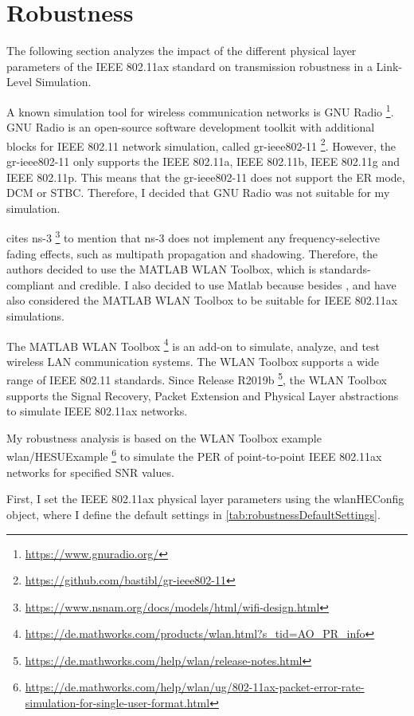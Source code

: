 \section{Robustness}
\label{sec:Robustness}
The following section analyzes the impact of the different physical layer parameters of the IEEE 802.11ax standard on transmission robustness in a
Link-Level Simulation.

A known simulation tool for wireless communication networks is GNU Radio \footnote{\url{https://www.gnuradio.org/}}.
GNU Radio is an open-source software development toolkit with additional blocks for IEEE 802.11 network simulation,
called gr-ieee802-11 \footnote{\url{https://github.com/bastibl/gr-ieee802-11}}.
However, the gr-ieee802-11 only supports the IEEE 802.11a, IEEE 802.11b, IEEE 802.11g and IEEE 802.11p.
This means that the gr-ieee802-11 does not support the \ac{ER} mode, \ac{DCM} or \ac{STBC}.
Therefore, I decided that GNU Radio was not suitable for my simulation.

\textcite{sheela_performance_2022} cites ns-3 \footnote{\url{https://www.nsnam.org/docs/models/html/wifi-design.html}} to mention
that ns-3 does not implement
any frequency-selective fading effects, such as multipath propagation and shadowing.
Therefore, the authors decided to use the MATLAB WLAN Toolbox, which is standards-compliant and credible.
I also decided to use Matlab because besides \cite{sheela_performance_2022}, \cite{cao_efficient_2022} and
\cite{jin_efficient_2021} have also considered
the MATLAB WLAN Toolbox to be suitable for IEEE 802.11ax simulations.

The MATLAB WLAN Toolbox \footnote{\url{https://de.mathworks.com/products/wlan.html?s_tid=AO_PR_info}} is an add-on to simulate, analyze, and test wireless LAN communication systems.
The WLAN Toolbox supports a wide range of IEEE 802.11 standards.
Since Release R2019b \footnote{\url{https://de.mathworks.com/help/wlan/release-notes.html}}, the WLAN Toolbox supports the Signal Recovery, Packet Extension and Physical Layer abstractions to simulate IEEE 802.11ax networks.

My robustness analysis is based on the WLAN Toolbox example wlan/HESUExample \footnote{\url{https://de.mathworks.com/help/wlan/ug/802-11ax-packet-error-rate-simulation-for-single-user-format.html}} to simulate the \ac{PER} of point-to-point IEEE 802.11ax networks for
 specified \ac{SNR} values.

First, I set the IEEE 802.11ax physical layer parameters using the wlanHEConfig object,
where I define the default settings in \autoref{tab:robustnessDefaultSettings}.


